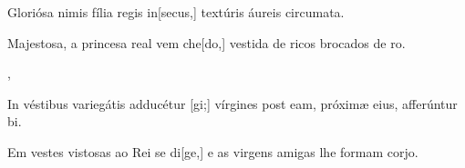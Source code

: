 {  {\item {}Gloriósa nimis fília regis in[secus,] textúris áureis circumata.~\Responsorium}%
    {\item {}Majestosa, a princesa real vem che[do,] vestida de ricos brocados de ro.~\Responsorium},
  {\item {}In véstibus variegátis adducétur [gi;] vírgines post eam, próximæ eius, afferúntur bi.~\Responsorium}%
    {\item {}Em vestes vistosas ao Rei se di[ge,] e as virgens amigas lhe formam corjo.~\Responsorium}
}